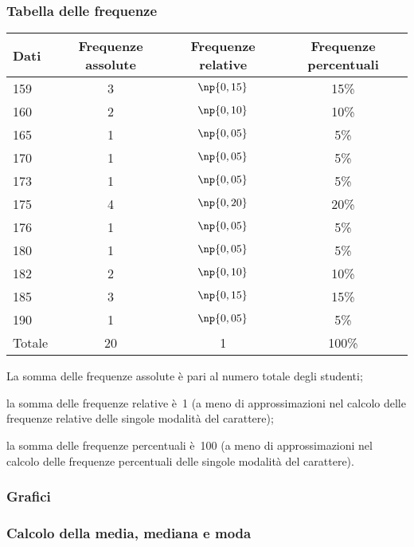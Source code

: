 \begin{exrig}
\begin{esempio}
\subsubsection{Tabella delle frequenze}
\begin{center}
\begin{tabular}{lccc}
\toprule
Dati & Frequenze assolute & Frequenze relative & Frequenze percentuali\\
\midrule
159 & 3 & $\np{0,15}$ & 15\% \\
160 & 2 & $\np{0,10}$ & 10\% \\
165 & 1 & $\np{0,05}$ & 5\% \\
170 & 1 & $\np{0,05}$ & 5\% \\
173 & 1 & $\np{0,05}$ & 5\% \\
175 & 4 & $\np{0,20}$ & 20\% \\
176 & 1 & $\np{0,05}$ & 5\% \\
180 & 1 & $\np{0,05}$ & 5\% \\
182 & 2 & $\np{0,10}$ & 10\% \\
185 & 3 & $\np{0,15}$ & 15\% \\
190 & 1 & $\np{0,05}$ & 5\% \\
\midrule
Totale & 20 & 1 & 100\% \\
\bottomrule
\end{tabular}
\end{center}
\begin{itemize*}
\item La somma delle frequenze assolute è pari al numero totale degli studenti;
\item la somma delle frequenze relative è~1 (a meno di approssimazioni nel calcolo delle frequenze relative delle singole modalità del carattere);
\item la somma delle frequenze percentuali è~100 (a meno di approssimazioni nel calcolo delle frequenze percentuali delle singole modalità del carattere).
\end{itemize*}

\subsubsection{Grafici}
\begin{center}
 
\end{center}

\subsubsection{Calcolo della media, mediana e moda}


\end{esempio}
\end{exrig}
